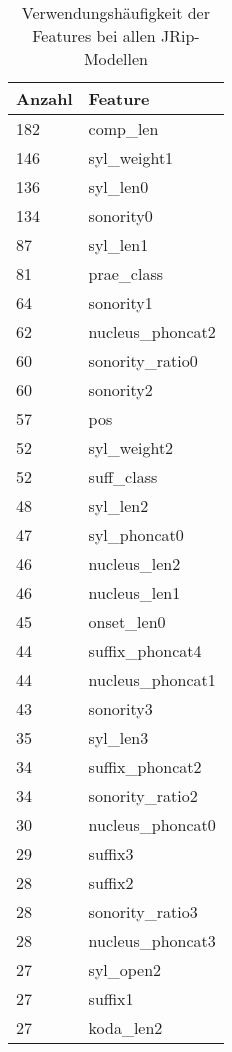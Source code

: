 \begin{table}
    \centering
    \tiny
    \caption{Verwendungshäufigkeit der Features bei allen JRip-Modellen}
    \label{table:jrip_feature_occurences}
    \begin{tabular}{|l|l|} \hline
    Anzahl & Feature \\\hline
     182 & comp\_len         \\
    146  & syl\_weight1      \\
    136  & syl\_len0         \\
    134  & sonority0         \\
    87   & syl\_len1         \\
    81   & prae\_class       \\
    64   & sonority1         \\
    62   & nucleus\_phoncat2 \\
    60   & sonority\_ratio0  \\
    60   & sonority2         \\
    57   & pos               \\
    52   & syl\_weight2      \\
    52   & suff\_class       \\
    48   & syl\_len2         \\
    47   & syl\_phoncat0     \\
    46   & nucleus\_len2     \\
    46   & nucleus\_len1     \\
    45   & onset\_len0       \\
    44   & suffix\_phoncat4  \\
    44   & nucleus\_phoncat1 \\
    43   & sonority3         \\
    35   & syl\_len3         \\
    34   & suffix\_phoncat2  \\
    34   & sonority\_ratio2  \\
    30   & nucleus\_phoncat0 \\
    29   & suffix3           \\
    28   & suffix2           \\
    28   & sonority\_ratio3  \\
    28   & nucleus\_phoncat3 \\
    27   & syl\_open2        \\
    27   & suffix1           \\
    27   & koda\_len2        \\

\end{tabular}
\end{table}
